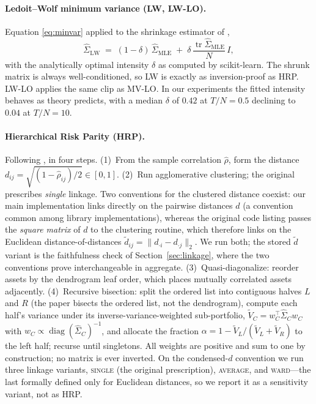 \documentclass[11pt]{article}
\newcommand{\Sighat}{\widehat{\Sigma}}
\newcommand{\TN}{T/N}
\begin{document}
\paragraph{Ledoit--Wolf minimum variance (LW, LW-LO).} Equation
\eqref{eq:minvar} applied to the shrinkage estimator of
\citet{ledoit2004well},
\begin{equation}
\Sighat_{\mathrm{LW}} \;=\; (1-\delta)\,\Sighat_{\mathrm{MLE}}
\;+\; \delta\,\frac{\operatorname{tr}\Sighat_{\mathrm{MLE}}}{N}\,I,
\label{eq:lw}
\end{equation}
with the analytically optimal intensity $\delta$ as computed by
scikit-learn. The shrunk matrix is always well-conditioned, so LW is exactly
as inversion-proof as HRP. LW-LO applies the same clip as MV-LO. In our
experiments the fitted intensity behaves as theory predicts, with a median
$\delta$ of $0.42$ at $\TN=0.5$ declining to $0.04$ at $\TN=10$.

\paragraph{Hierarchical Risk Parity (HRP).} Following
\citet{lopezdeprado2016building}, in four steps. (1)~From the sample
correlation $\hat{\rho}$, form the distance
$d_{ij}=\sqrt{(1-\hat{\rho}_{ij})/2}\in[0,1]$. (2)~Run agglomerative
clustering; the original prescribes \emph{single} linkage. Two conventions
for the clustered distance coexist: our main implementation links directly
on the pairwise distances $d$ (a convention common among library
implementations), whereas the original code listing passes the \emph{square
matrix} of $d$ to the clustering routine, which therefore links on the
Euclidean distance-of-distances
$\tilde{d}_{ij}=\lVert d_{\cdot i}-d_{\cdot j}\rVert_2$. We run both; the
stored $\tilde{d}$ variant is the faithfulness check of
Section~\ref{sec:linkage}, where the two conventions prove interchangeable
in aggregate. (3)~Quasi-diagonalize: reorder assets by the dendrogram leaf
order, which places mutually correlated assets adjacently. (4)~Recursive
bisection: split the ordered list into contiguous halves $L$ and $R$ (the
paper bisects the ordered list, not the dendrogram), compute each half's
variance under its inverse-variance-weighted sub-portfolio,
$\tilde{V}_{C}=w_{C}^{\top}\Sighat_{C}w_{C}$ with
$w_{C}\propto\operatorname{diag}(\Sighat_{C})^{-1}$, and allocate the
fraction $\alpha = 1 - \tilde{V}_{L}/(\tilde{V}_{L}+\tilde{V}_{R})$ to the
left half; recurse until singletons. All weights are positive and sum to one
by construction; no matrix is ever inverted. On the condensed-$d$ convention
we run three linkage variants, \textsc{single} (the original prescription),
\textsc{average}, and \textsc{ward}---the last formally defined only for
Euclidean distances, so we report it as a sensitivity variant, not as HRP.
\end{document}
